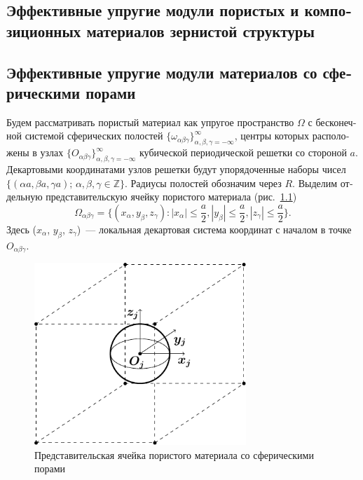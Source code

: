 
\begin{russian}
\chapter[Эффективные упругие модули пористых и композиционных материалов зернистой структуры]{Эффективные упругие модули пористых и композиционных материалов зернистой структуры}

\section[Эффективные упругие модули материалов со сферическими порами]{Эффективные упругие модули материалов со сферическими порами}

Будем рассматривать пористый материал как упругое пространство $\Omega$ с бесконечной системой сферических полостей $\{\omega_{\alpha\beta\gamma}\}_{\alpha,\beta,\gamma=-\infty}^\infty$, центры которых расположены в узлах $\{O_{\alpha\beta\gamma}\}_{\alpha,\beta,\gamma=-\infty}^\infty$ кубической периодической решетки со стороной $a$. Декартовыми координатами узлов решетки будут упорядоченные наборы чисел $\{(\alpha a,\beta a,\gamma a);\,\alpha,\beta,\gamma\in\mathbb{Z}\}$. Радиусы полостей обозначим через $R$. Выделим отдельную представительскую ячейку пористого материала (рис.~\ref{f:12:1})
$$
\Omega_{\alpha\beta\gamma}=\bigg\{(x_\alpha,y_\beta,z_\gamma): |x_\alpha|\le\dfrac{a}{2},|y_\beta|\le\dfrac{a}{2},|z_\gamma|\le\dfrac{a}{2}\bigg\}.
$$
Здесь ($x_\alpha$, $y_\beta$, $z_\gamma$)~--- локальная декартовая система координат с началом в точке $O_{\alpha\beta\gamma}$.

\begin{figure}[h!]
\centering
\includegraphics[width=8cm]{cell-spheres.pdf}
\caption{Представительская ячейка пористого материала со сферическими порами}
\label{f:12:1}
\end{figure}


\end{russian}
